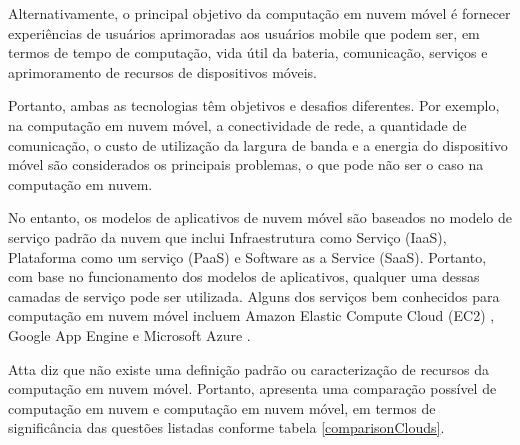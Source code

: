 \documentclass[12pt]{article}
\begin{document}
Alternativamente, o principal objetivo da computação em nuvem móvel é fornecer experiências de usuários aprimoradas
aos usuários mobile que podem ser, em termos de tempo de computação, vida útil da bateria, comunicação, serviços e 
aprimoramento de recursos de dispositivos móveis.

Portanto, ambas as tecnologias têm objetivos e desafios diferentes. Por exemplo, na computação em nuvem móvel,
a conectividade de rede, a quantidade de comunicação, o custo de utilização da largura de banda e a energia do 
dispositivo móvel são considerados os principais problemas, o que pode não ser o caso na computação em nuvem.

No entanto, os modelos de aplicativos de nuvem móvel são baseados no modelo de serviço padrão da nuvem que inclui 
Infraestrutura como Serviço (IaaS), Plataforma como um serviço (PaaS) e Software as a Service (SaaS). Portanto, 
com base no funcionamento dos modelos de aplicativos, qualquer uma dessas camadas de serviço pode ser utilizada.
Alguns dos serviços bem conhecidos para computação em nuvem móvel incluem Amazon Elastic Compute Cloud (EC2) \cite{amazon}, 
Google App Engine \cite{googleapp} e Microsoft Azure \cite{azure}.

Atta \cite{atta2013} diz que não existe uma definição padrão ou caracterização de recursos da computação em nuvem móvel.
Portanto, apresenta uma comparação possível de computação em nuvem e computação em nuvem móvel, em termos de significância 
das questões listadas conforme tabela \ref{comparisonClouds}.
\end{document}
